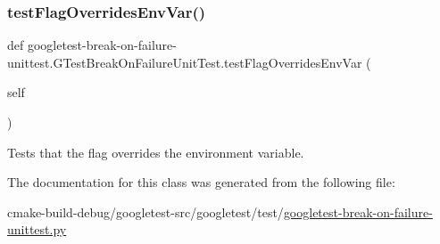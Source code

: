 \subsubsection{\texorpdfstring{testFlagOverridesEnvVar()}{testFlagOverridesEnvVar()}}
{\footnotesize\ttfamily def googletest-\/break-\/on-\/failure-\/unittest.\+G\+Test\+Break\+On\+Failure\+Unit\+Test.\+test\+Flag\+Overrides\+Env\+Var (\begin{DoxyParamCaption}\item[{}]{self }\end{DoxyParamCaption})}

\begin{DoxyVerb}Tests that the flag overrides the environment variable.\end{DoxyVerb}
 

The documentation for this class was generated from the following file\+:\begin{DoxyCompactItemize}
\item 
cmake-\/build-\/debug/googletest-\/src/googletest/test/\mbox{\hyperlink{googletest-break-on-failure-unittest_8py}{googletest-\/break-\/on-\/failure-\/unittest.\+py}}\end{DoxyCompactItemize}
